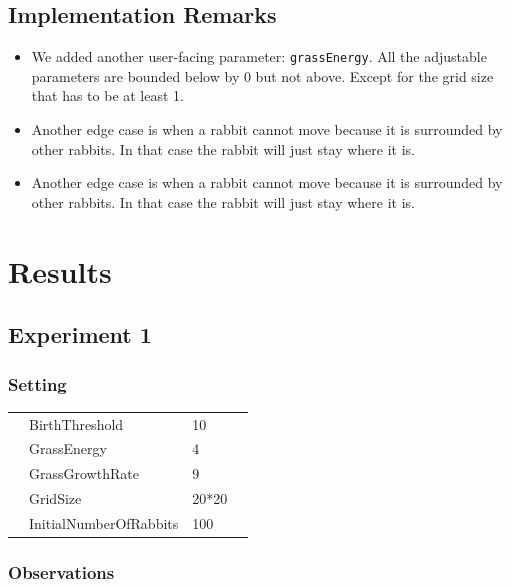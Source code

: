 \documentclass[11pt]{article}
\begin{document}
 \subsection{Implementation Remarks}
 \begin{itemize}
   
   \item
   We added another user-facing  parameter: \texttt{grassEnergy}. All the 
 adjustable parameters are bounded  below by 0 but not above. Except for the 
 grid size that has to be at least 1.
 
 \item
 Another edge case is when a rabbit cannot move because it is surrounded by 
 other rabbits. In that case the rabbit will just stay where it is.
 
  \item
 Another edge case is when a rabbit cannot move because it is surrounded by 
 other rabbits. In that case the rabbit will just stay where it is.
 
 \end{itemize}
   


 \section{Results}

 \subsection{Experiment 1}
 \subsubsection{Setting}

 \begin{table}[H]
  \begin{tabular}{llll}
   &BirthThreshold  &10\\
   &GrassEnergy  &4 \\
   &GrassGrowthRate  &9\\
   &GridSize  &20*20\\
   &InitialNumberOfRabbits  &100
  \end{tabular}
 \end{table}
 
 \subsubsection{Observations}
 
\end{document}
